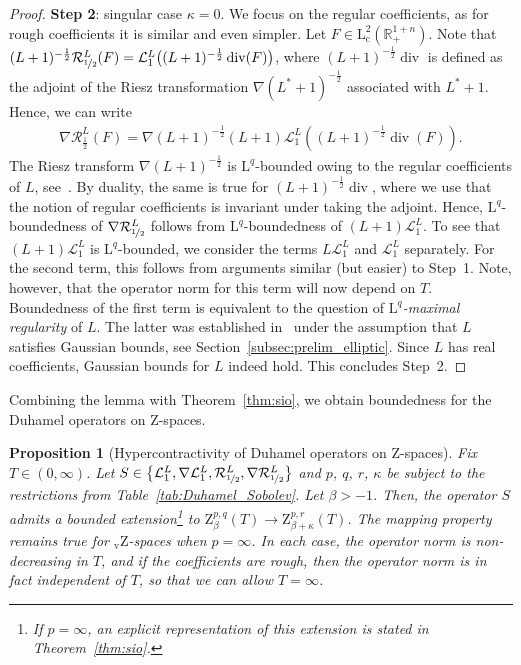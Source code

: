 \documentclass[11pt, leqno]{amsart}
\newtheorem{proposition}[theorem]{Proposition}
\theoremstyle{definition}
\newcommand{\R}{\mathbb{R}}
\renewcommand{\L}{\mathrm{L}}
\newcommand{\Z}{\mathrm{Z}}
\newcommand{\Zv}{{}_\mathrm{v}\mathrm{Z}}
\newcommand{\Sol}{\mathcal{R}}
\newcommand{\Soll}{\mathcal{L}}
\newcommand{\cc}{\mathrm{c}}
\DeclareMathOperator{\Div}{div}
\begin{document}
\begin{proof}
		\textbf{Step 2}: singular case $\kappa = 0$. We focus on the regular coefficients, as for rough coefficients it is similar and even simpler.
		Let $F\in \L^2_\cc(\R^{1+n}_+)$.
		Note that $(L+1)^{-\frac{1}{2}} \Sol^L_{\nicefrac{1}{2}}(F) = \Soll^L_1 \bigl((L+1)^{-\frac{1}{2}} \Div(F) \bigr)$, where $(L+1)^{-\frac{1}{2}} \Div$ is defined as the adjoint of the Riesz transformation $\nabla (L^*+1)^{-\frac{1}{2}}$ associated with $L^*+1$.
		Hence, we can write
		\begin{align}
			\nabla \Sol^L_\frac{1}{2}(F) = \nabla (L+1)^{-\frac{1}{2}} (L+1) \Soll^L_1((L+1)^{-\frac{1}{2}} \Div(F)).
		\end{align}
		The Riesz transform $\nabla (L+1)^{-\frac{1}{2}}$ is $\L^q$-bounded owing to the regular coefficients of $L$, see~\cite[Thm.~4.1]{Memoirs}. By duality, the same is true for $(L+1)^{-\frac{1}{2}} \Div$, where we use that the notion of regular coefficients is invariant under taking the adjoint. Hence, $\L^q$-boundedness of $\nabla \Sol^L_{\nicefrac{1}{2}}$ follows from $\L^q$-boundedness of $(L+1) \Soll^L_1$. To see that $(L+1) \Soll^L_1$ is $\L^q$-bounded, we consider the terms $L \Soll^L_1$ and $\Soll^L_1$ separately. For the second term, this follows from arguments similar (but easier) to Step~1. Note, however, that the operator norm for this term will now depend on $T$. Boundedness of the first term is equivalent to the question of \emph{$\L^q$-maximal regularity} of $L$. The latter was established %
		in~\cite{Coulhon_Duong} under the assumption that $L$ satisfies Gaussian bounds, see Section~\ref{subsec:prelim_elliptic}. Since $L$ has real coefficients, Gaussian bounds for $L$ indeed hold. This concludes Step~2.
	\end{proof}

	Combining the lemma with Theorem~\ref{thm:sio}, we obtain boundedness for the Duhamel operators on $\Z$-spaces.

	\begin{proposition}[Hypercontractivity of Duhamel operators on $\Z$-spaces]
		\label{prop:Duhamel_mapping_Z}
		Fix $T \in (0,\infty)$. Let $S \in \bigl\{ \Soll^L_1, \nabla \Soll^L_1, \Sol^L_{\nicefrac{1}{2}}, \nabla \Sol^L_{\nicefrac{1}{2}} \bigr\}$ and $p$, $q$, $r$, $\kappa$ be subject to the restrictions from Table~\ref{tab:Duhamel_Sobolev}.
		Let $\beta > -1$.
		Then, the operator $S$ admits a bounded extension\footnote{If $p = \infty$, an explicit representation of this extension is stated in Theorem~\ref{thm:sio}.} to $\Z^{p,q}_\beta(T) \to \Z^{p,r}_{\beta + \kappa}(T)$. The mapping property remains true for $\Zv$-spaces when $p=\infty$.
		In each case, the operator norm is non-decreasing in $T$, and if the coefficients are rough, then the operator norm is in fact independent of $T$, so that we can allow $T = \infty$.
	\end{proposition}
\end{document}
